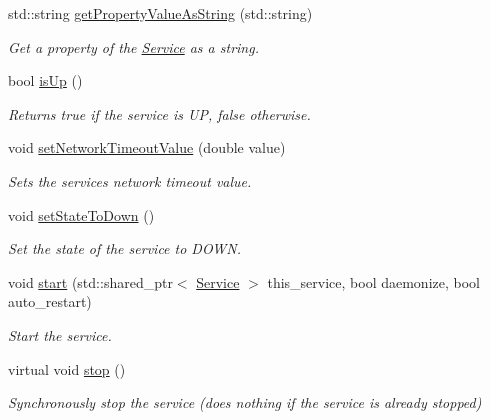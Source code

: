 \begin{DoxyCompactItemize}
std\+::string \hyperlink{classwrench_1_1_service_af7da6bc9cb5d322bfdc6467941f2372f}{get\+Property\+Value\+As\+String} (std\+::string)
\begin{DoxyCompactList}\small\item\em Get a property of the \hyperlink{classwrench_1_1_service}{Service} as a string. \end{DoxyCompactList}\item 
bool \hyperlink{classwrench_1_1_service_a2549b97c1454e075ebadbb38563763e0}{is\+Up} ()
\begin{DoxyCompactList}\small\item\em Returns true if the service is UP, false otherwise. \end{DoxyCompactList}\item 
void \hyperlink{classwrench_1_1_service_a2bdf99201280d83b44a03c0b78ebdf90}{set\+Network\+Timeout\+Value} (double value)
\begin{DoxyCompactList}\small\item\em Sets the service\textquotesingle{}s network timeout value. \end{DoxyCompactList}\item 
\mbox{\label{classwrench_1_1_service_a730c3eb13321940c6c831dbb605d1824}} 
void \hyperlink{classwrench_1_1_service_a730c3eb13321940c6c831dbb605d1824}{set\+State\+To\+Down} ()
\begin{DoxyCompactList}\small\item\em Set the state of the service to D\+O\+WN. \end{DoxyCompactList}\item 
void \hyperlink{classwrench_1_1_service_a77f35bdb636f0b6f819ae28135081ce8}{start} (std\+::shared\+\_\+ptr$<$ \hyperlink{classwrench_1_1_service}{Service} $>$ this\+\_\+service, bool daemonize, bool auto\+\_\+restart)
\begin{DoxyCompactList}\small\item\em Start the service. \end{DoxyCompactList}\item 
virtual void \hyperlink{classwrench_1_1_service_ac33a32f4758c6f51b27d2cfb9b46efda}{stop} ()
\begin{DoxyCompactList}\small\item\em Synchronously stop the service (does nothing if the service is already stopped) \end{DoxyCompactList}\end{DoxyCompactItemize}
